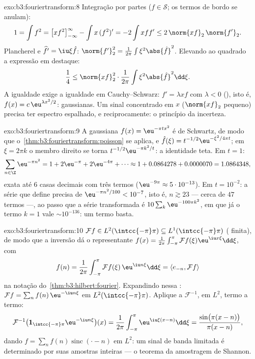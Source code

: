 \begin{solution}{exo:b3:fouriertransform:8}
Integração por partes ($f \in \mathcal S$; os termos de bordo
se anulam):
\[
1 = \int f^2 = \bigl[xf^2\bigr]_{-\infty}^{\infty} - \int
x\,(f^2)' = -2\int xff' \leq 2\,\norm{xf}_2\,\norm{f'}_2 .
\]
Plancherel e $\widehat{f'} = \iu\xi\hat f$:
$\norm{f'}_2^2 = \frac1{2\pi}\int\xi^2\abs{\hat f}^2$. Elevando ao quadrado
a expressão em destaque:
\[
\frac14 \leq \norm{xf}_2^2\cdot\frac1{2\pi}
\int\xi^2\abs{\hat f}^2\dd\xi .
\]
A igualdade exige a igualdade em Cauchy--Schwarz: $f' =
\lambda xf$ com $\lambda < 0$ (), isto é, $f(x) =
c\,\eu^{\lambda x^2/2}$: gaussianas. Um sinal concentrado em
$x$ ($\norm{xf}_2$ pequeno) precisa ter espectro espalhado, e
reciprocamente: o princípio da incerteza.
\end{solution}

\begin{solution}{exo:b3:fouriertransform:9}
A gaussiana $f(x) = \eu^{-\pi tx^2}$ é de Schwartz, de modo que
o~\cref{thm:b3:fouriertransform:poisson} se aplica, e
$\hat f(\xi) = t^{-1/2}\eu^{-\xi^2/4\pi t}$; em $\xi = 2\pi
k$ o membro direito se torna $t^{-1/2}\eu^{-\pi k^2/t}$: a
identidade teta. Em $t = 1$:
\[
\sum_{n\in\Z}\eu^{-\pi n^2} = 1 + 2\eu^{-\pi} + 2\eu^{-4\pi} +
\cdots \approx 1 + 0.0864278 + 0.0000070 = 1.0864348,
\]
exata até $6$ casas decimais com três termos ($\eu^{-9\pi}
\approx 5\cdot10^{-13}$). Em $t = 10^{-2}$: a série que define
precisa de $\eu^{-\pi n^2/100} < 10^{-7}$, isto é, $n \gtrsim
23$ --- cerca de $47$ termos ---, ao passo que a série transformada é
$10\sum_k\eu^{-100\pi k^2}$, em que já o termo $k = 1$ vale
$\sim 10^{-136}$: um termo basta.
\end{solution}

\begin{solution}{exo:b3:fouriertransform:10}
$\mathcal Ff \in L^2(\intcc{-\pi}\pi) \subseteq
L^1(\intcc{-\pi}\pi)$ ( finita), de modo que a inversão dá o
representante  $f(x) =
\frac1{2\pi}\int_{-\pi}^\pi\mathcal Ff(\xi)\eu^{\iu
x\xi}\dd\xi$, com
\[
f(n) = \frac1{2\pi}\int_{-\pi}^{\pi}\mathcal
Ff(\xi)\,\eu^{\iu n\xi}\dd\xi = \langle e_{-n}, \mathcal
Ff\rangle
\]
na notação do~\cref{thm:b3:hilbert:fourier}. Expandindo
nessa : $\mathcal Ff = \sum_nf(n)\,\eu^{-\iu
n\xi}$ em $L^2(\intcc{-\pi}\pi)$. Aplique a
$\mathcal F^{-1}$,  em $L^2$, termo a termo:
\[
\mathcal F^{-1}\bigl(\mathbf
1_{\intcc{-\pi}\pi}\eu^{-\iu n\xi}\bigr)(x)
= \frac1{2\pi}\int_{-\pi}^{\pi}\eu^{\iu\xi(x - n)}\dd\xi
= \frac{\sin\bigl(\pi(x-n)\bigr)}{\pi(x - n)} ,
\]
dando $f = \sum_nf(n)\operatorname{sinc}(\cdot - n)$ em
$L^2$: um sinal de banda limitada é determinado por suas amostras
inteiras --- o teorema da amostragem de Shannon.
\end{solution}

